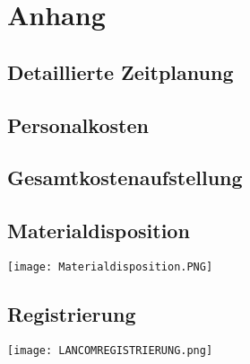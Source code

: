 \section{Anhang}
\subsection{Detaillierte Zeitplanung}
\label{app:Zeitplanung}

\subsection{Personalkosten}
\label{app:Personalkosten}
\subsection{Gesamtkostenaufstellung}
\label{app:Gesamtkostenaufstellung}

\clearpage

%
\subsection{Materialdisposition}
\label{app:Materialdisposition}
\texttt{[image: Materialdisposition.PNG]}

\subsection{Registrierung}
\label{Registrierung}
\texttt{[image: LANCOMREGISTRIERUNG.png]}
\clearpage



